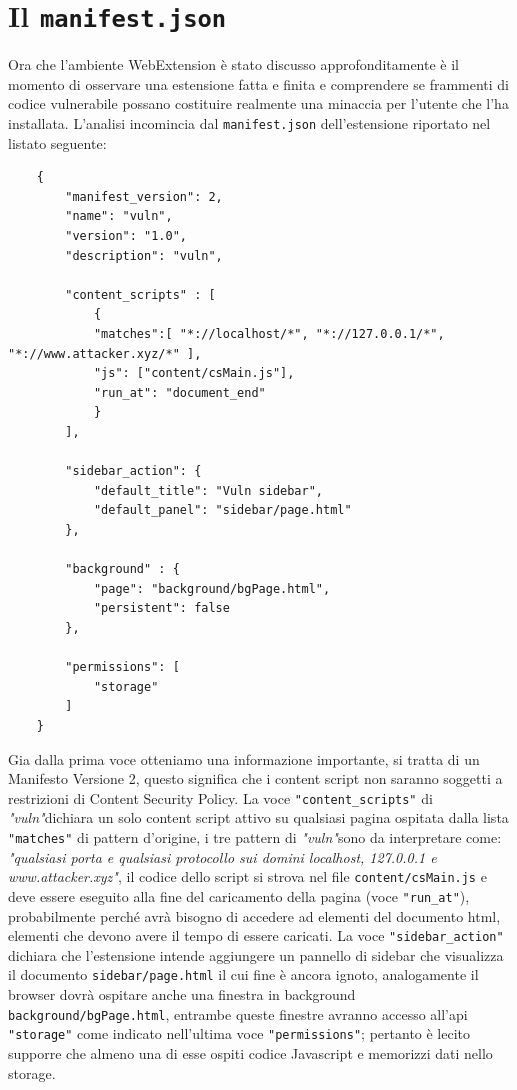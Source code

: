 \documentclass{sapthesis}
\newcommand{\code}[1]{\texttt{#1}}
\newcommand{\file}[1]{\code{#1}}
\newcommand{\vuln}{\textit{"vuln"}}
\newcommand{\JS}{Javascript }
\newcommand{\manifest}{\code{manifest.json} }
\begin{document}
    \section{Il \manifest}
    \label{sec:analisi-vuln-manifest}
        Ora che l'ambiente WebExtension è stato discusso approfonditamente è il momento di
        osservare una estensione fatta e finita e comprendere se frammenti di codice vulnerabile
        possano costituire realmente una minaccia per l'utente che l'ha installata.
        L'analisi incomincia dal \manifest dell'estensione riportato nel listato seguente:
        \begin{lstlisting}
    {
        "manifest_version": 2,
        "name": "vuln",
        "version": "1.0",
        "description": "vuln",

        "content_scripts" : [
            {
            "matches":[ "*://localhost/*", "*://127.0.0.1/*", "*://www.attacker.xyz/*" ],
            "js": ["content/csMain.js"],
            "run_at": "document_end"
            }
        ],

        "sidebar_action": {
            "default_title": "Vuln sidebar",
            "default_panel": "sidebar/page.html"
        },

        "background" : {
            "page": "background/bgPage.html",
            "persistent": false
        },

        "permissions": [
            "storage"
        ]
    }
        \end{lstlisting}
        Gia dalla prima voce otteniamo una informazione importante, si tratta di un Manifesto Versione 2,
        questo significa che i content script non saranno soggetti a restrizioni di Content Security Policy.
        La voce \code{"content\_scripts"} di \vuln dichiara un solo content script attivo su qualsiasi pagina ospitata dalla
        lista \code{"matches"} di pattern d'origine, i tre pattern di \vuln sono da interpretare come:
        \textit{"qualsiasi porta e qualsiasi protocollo sui domini localhost, 127.0.0.1 e www.attacker.xyz"},
        il codice dello script si strova nel file \file{content/csMain.js} e deve essere eseguito
        alla fine del caricamento della pagina (voce \code{"run\_at"}), probabilmente perché avrà bisogno
        di accedere ad elementi del documento html, elementi che devono avere il tempo di essere caricati.
        La voce \code{"sidebar\_action"} dichiara che l'estensione intende aggiungere un pannello di sidebar
        che visualizza il documento \file{sidebar/page.html} il cui fine è ancora ignoto, analogamente
        il browser dovrà ospitare anche una finestra in background \file{background/bgPage.html}, entrambe
        queste finestre avranno accesso all'api \code{"storage"} come indicato nell'ultima voce \code{"permissions"};
        pertanto è lecito supporre che almeno una di esse ospiti codice \JS e memorizzi dati nello storage.
        
\end{document}
